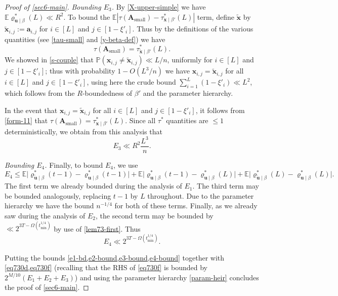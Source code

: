\documentclass[11pt,reqno]{amsart}
\numberwithin{equation}{section}
\theoremstyle{definition}
\theoremstyle{remark}
\newcommand{\mb}{\mathbb}
\newcommand{\mbf}{\mathbf}
\renewcommand{\le}{\leqslant}
\def\sml{\operatorname{small}}
\begin{document}
\begin{proof}[Proof of \cref{sec6-main}]
\emph{Bounding $E_3$.} By \cref{X-upper-simple} we have $\mb{E} \varrho^*_{\mbf{u} \mid \beta}(L) \ll R^2$. To bound the $\mb{E} | \tau(\mbf{A}_{\sml}) - \tau^*_{\mbf{x} \mid \beta'}(L)|$ term, define $\tilde{\mbf{x}}$ by $\tilde{\mbf{x}}_{i,j} := \mbf{a}_{i, j}$ for $i \in [L]$ and $j \in [1 - \xi'_i]$. Thus by the definitions of the various quantities (see \cref{tau-small} and \cref{y-beta-def}) we have
\begin{equation}\label{form-11} \tau(\mbf{A}_{\sml}) = \tau^*_{\tilde{\mbf{x}} \mid \beta'}(L). \end{equation}
We showed in \cref{s-couple} that $\mb{P}(\mbf{x}_{i,j} \ne \tilde{\mbf{x}}_{i,j}) \ll L/n$, uniformly for $i \in [L]$ and $j \in [1 - \xi'_i]$; thus with probability $1 - O(L^3/n)$ we have $\mbf{x}_{i,j} = \tilde{\mbf{x}}_{i,j}$ for all $i \in [L]$ and $j \in [1 - \xi'_i]$, using here the crude bound $\sum_{i =1}^L (1 - \xi'_i) \ll L^2$, which follows from the $R$-boundedness of $\beta'$ and the parameter hierarchy.

In the event that $\mbf{x}_{i,j} = \tilde{\mbf{x}}_{i,j}$ for all $i \in [L]$ and $j \in [1 - \xi'_i]$, it follows from \cref{form-11} that $\tau(\mbf{A}_{\sml}) = \tau^*_{\mbf{x} \mid \beta'}(L)$. Since all $\tau^*$ quantities are $\le 1$ deterministically, we obtain from this analysis that
\begin{equation}\label{e3-bound} E_3 \ll R^2 \frac{L^3}{n} .\end{equation}

\emph{Bounding $E_4$.} Finally, to bound $E_4$, we use
\[ E_4 \le \mb{E}\big| \varrho^*_{\tilde{\mbf{u}} \mid \beta}(t-1) - \varrho^*_{\mbf{u} \mid \beta}(t-1)\big| + \mb{E} \big| \varrho^*_{\mbf{u} \mid \beta}(t-1) - \varrho^*_{\mbf{u} \mid \beta}(L)\big| + \mb{E}\big| \varrho^*_{\tilde{\mbf{u}} \mid \beta}(L) - \varrho^*_{\mbf{u} \mid \beta}(L)\big|. \] The first term we already bounded during the analysis of $E_1$. The third term may be bounded analogously, replacing $t-1$ by $L$ throughout. Due to the parameter hierarchy we have the bound $n^{-1/4}$ for both of these terms. Finally, as we already saw during the analysis of $E_2$, the second term may be bounded by $\ll 2^{3T - \Omega(t_{\min}^{1/4})}$ by use of \cref{lem73-first}. Thus
\begin{equation}\label{e4-bound} E_4 \ll 2^{3T - \Omega(t_{\min}^{1/4})}.\end{equation}


Putting the bounds \cref{e1-bd,e2-bound,e3-bound,e4-bound} together with \cref{eq730d,eq730f} (recalling that the RHS of \cref{eq730f} is bounded by $2^{M/10}(E_1 + E_2 + E_3)$) and using the parameter hierarchy \cref{param-heir} concludes the proof of \cref{sec6-main}.\end{proof}
\end{document}
